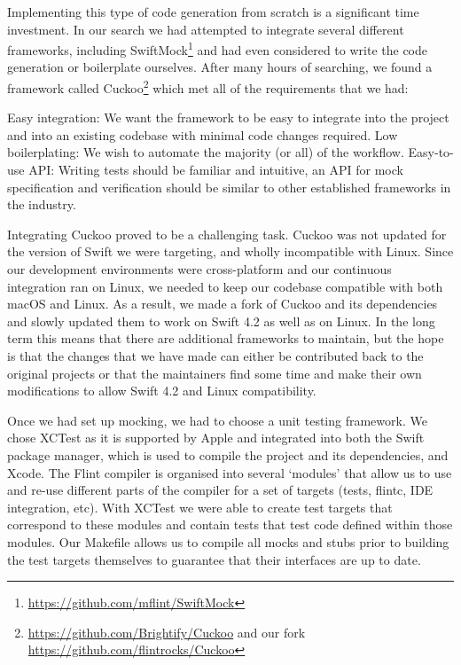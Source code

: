 Implementing this type of code generation from scratch is a significant time investment. In our search we had attempted to integrate several different frameworks, including SwiftMock\footnote{\url{https://github.com/mflint/SwiftMock}} and had even considered to write the code generation or boilerplate ourselves. After many hours of searching, we found a framework called Cuckoo\footnote{\url{https://github.com/Brightify/Cuckoo} and our fork \url{https://github.com/flintrocks/Cuckoo}} which met all of the requirements that we had:

Easy integration: We want the framework to be easy to integrate into the project and into an existing codebase with minimal code changes required.
Low boilerplating: We wish to automate the majority (or all) of the workflow.
Easy-to-use API: Writing tests should be familiar and intuitive, an API for mock specification and verification should be similar to other established frameworks in the industry.

Integrating Cuckoo proved to be a challenging task. Cuckoo was not updated for the version of Swift we were targeting, and wholly incompatible with Linux. Since our development environments were cross-platform and our continuous integration ran on Linux, we needed to keep our codebase compatible with both macOS and Linux. As a result, we made a fork of Cuckoo and its dependencies and slowly updated them to work on Swift 4.2 as well as on Linux. In the long term this means that there are additional frameworks to maintain, but the hope is that the changes that we have made can either be contributed back to the original projects or that the maintainers find some time and make their own modifications to allow Swift 4.2 and Linux compatibility.

Once we had set up mocking, we had to choose a unit testing framework. We chose XCTest as it is supported by Apple and integrated into both the Swift package manager, which is used to compile the project and its dependencies, and Xcode. The Flint compiler is organised into several `modules' that allow us to use and re-use different parts of the compiler for a set of targets (tests, flintc, IDE integration, etc). With XCTest we were able to create test targets that correspond to these modules and contain tests that test code defined within those modules. Our Makefile allows us to compile all mocks and stubs prior to building the test targets themselves to guarantee that their interfaces are up to date.


